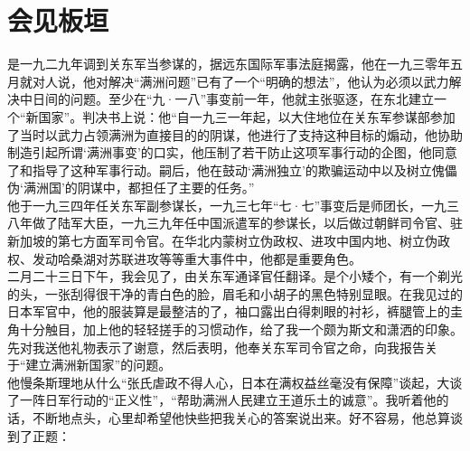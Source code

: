 \fancyhead[RO]{} %
\fancyhead[LE]{} %
\chapter*{会见板垣}
\thispagestyle{empty}
是一九二九年调到关东军当参谋的，据远东国际军事法庭揭露，他在一九三零年五月就对人说，他对解决“满洲问题”已有了一个“明确的想法”，他认为必须以武力解决中日间的问题。至少在“九·一八”事变前一年，他就主张驱逐，在东北建立一个“新国家”。判决书上说：他“自一九三一年起，以大住地位在关东军参谋部参加了当时以武力占领满洲为直接目的的阴谋，他进行了支持这种目标的煽动，他协助制造引起所谓‘满洲事变’的口实，他压制了若干防止这项军事行动的企图，他同意了和指导了这种军事行动。嗣后，他在鼓动‘满洲独立’的欺骗运动中以及树立傀儡伪‘满洲国’的阴谋中，都担任了主要的任务。”\\

他于一九三四年任关东军副参谋长，一九三七年“七·七”事变后是师团长，一九三八年做了陆军大臣，一九三九年任中国派遣军的参谋长，以后做过朝鲜司令官、驻新加坡的第七方面军司令官。在华北内蒙树立伪政权、进攻中国内地、树立伪政权、发动哈桑湖对苏联进攻等等重大事件中，他都是重要角色。\\

二月二十三日下午，我会见了，由关东军通译官任翻译。是个小矮个，有一个剃光的头，一张刮得很干净的青白色的脸，眉毛和小胡子的黑色特别显眼。在我见过的日本军官中，他的服装算是最整洁的了，袖口露出白得刺眼的衬衫，裤腿管上的圭角十分触目，加上他的轻轻搓手的习惯动作，给了我一个颇为斯文和潇洒的印象。先对我送他礼物表示了谢意，然后表明，他奉关东军司令官之命，向我报告关于“建立满洲新国家”的问题。\\

他慢条斯理地从什么“张氏虐政不得人心，日本在满权益丝毫没有保障”谈起，大谈了一阵日军行动的“正义性”，“帮助满洲人民建立王道乐土的诚意”。我听着他的话，不断地点头，心里却希望他快些把我关心的答案说出来。好不容易，他总算谈到了正题：\\

